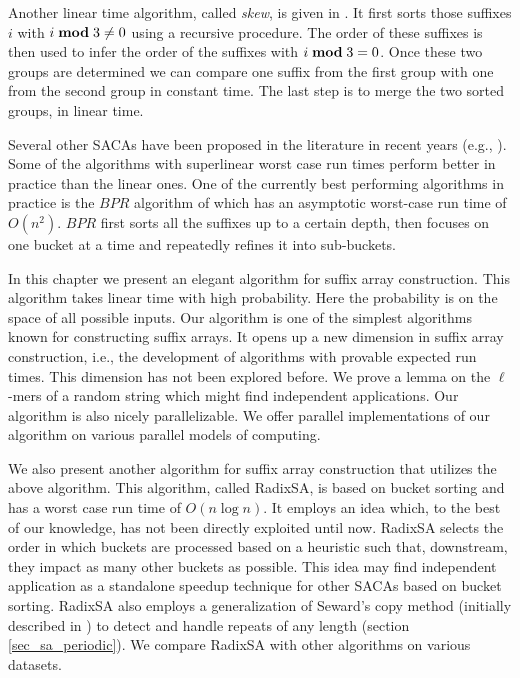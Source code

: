 Another linear time algorithm, called {\em skew}, is given
in \cite{KaSa03}. It first sorts those suffixes $i$ with $i \;{\bf mod}\; 3 \neq
0$ using a recursive procedure. The order of these suffixes is then used to
infer the order of the suffixes with $i
\;{\bf mod}\; 3 = 0$. Once these two groups are determined we can compare
one suffix from the first group with one from the second group in constant time.
The last step is to merge the two sorted groups, in linear time.

Several other SACAs have been proposed in the literature in recent
years (e.g., \cite{NZC09,ScSt07}). Some of the algorithms with superlinear
worst case run times perform better in practice than the linear ones.
One of the currently best performing algorithms in practice is the $BPR$ 
algorithm of \cite{ScSt07} which
has an asymptotic worst-case run time of $O(n^2)$. $BPR$ first sorts all the
suffixes up to a certain depth, then focuses on one bucket at a time and
repeatedly refines it into sub-buckets.

In this chapter we present an elegant algorithm for suffix array construction.
This algorithm takes linear time with high probability. Here the probability is 
on the space of all possible inputs. Our algorithm is one of the simplest 
algorithms known for constructing suffix arrays. It opens up a new dimension in
suffix array construction, i.e., the development of algorithms with provable
expected run times. This dimension has not been explored before. We prove a
lemma on the $\ell$-mers of a random  string which might find independent
applications. Our algorithm is  also nicely parallelizable. We offer parallel
implementations of our algorithm on various parallel models of computing.

We also present another algorithm for suffix array construction that utilizes 
the above algorithm. This algorithm, called RadixSA, is based on bucket sorting
and has a worst case run time of $O(n\log{n})$. It employs an idea which, 
to the best of our knowledge, has not been directly exploited until now. 
RadixSA selects the order in which buckets are processed based on a heuristic
such that, downstream, they impact as many other buckets as possible. 
This idea may find independent application as a standalone speedup technique for 
other SACAs based on bucket sorting.
RadixSA also employs a generalization of Seward's copy method \cite{Sew2000} 
(initially described in \cite{BuWe94}) to
detect and handle repeats of any length (section \ref{sec_sa_periodic}). We
compare RadixSA with other algorithms on various datasets.

